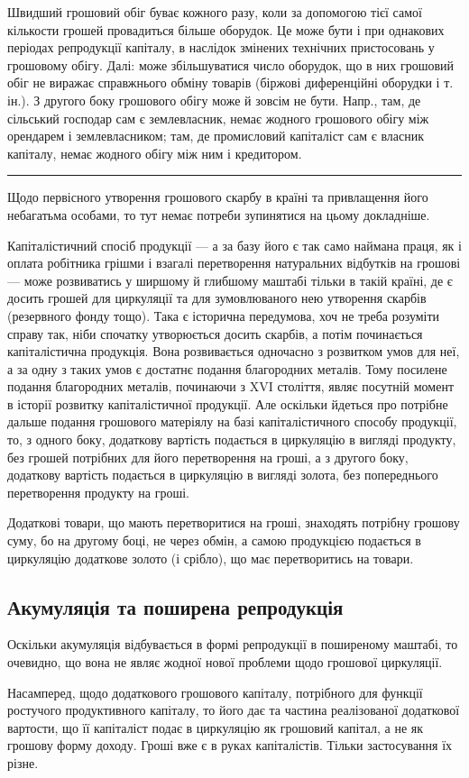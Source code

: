 
Швидший грошовий обіг буває кожного разу, коли за допомогою тієї
самої кількости грошей провадиться більше оборудок. Це може бути і
при однакових періодах репродукції капіталу, в наслідок змінених технічних
пристосовань у грошовому обігу. Далі: може збільшуватися число
оборудок, що в них грошовий обіг не виражає справжнього обміну товарів
(біржові диференційні оборудки і т. ін.). З другого боку грошового
обігу може й зовсім не бути. Напр., там, де сільський господар сам є
землевласник, немає жодного грошового обігу між орендарем і землевласником;
там, де промисловий капіталіст сам є власник капіталу, немає
жодного обігу між ним і кредитором.
\pfbreak
Щодо первісного утворення грошового скарбу в країні та привлащення
його небагатьма особами, то тут немає потреби зупинятися на
цьому докладніше.

Капіталістичний спосіб продукції — а за базу його є так само наймана
праця, як і оплата робітника грішми і взагалі перетворення натуральних
відбутків на грошові — може розвиватись у ширшому й глибшому маштабі
тільки в такій країні, де є досить грошей для циркуляції та для
зумовлюваного нею утворення скарбів (резервного фонду тощо). Така є
історична передумова, хоч не треба розуміти справу так, ніби спочатку
утворюється досить скарбів, а потім починається капіталістична продукція.
Вона розвивається одночасно з розвитком умов для неї, а за одну з
таких умов є достатнє подання благородних металів. Тому посилене подання
благородних металів, починаючи з XVI століття, являє посутній
момент в історії розвитку капіталістичної продукції. Але оскільки йдеться
про потрібне дальше подання грошового матеріялу на базі капіталістичного
способу продукції, то, з одного боку, додаткову вартість
подається в циркуляцію в вигляді продукту, без грошей потрібних для
його перетворення на гроші, а з другого боку, додаткову вартість подається
в циркуляцію в вигляді золота, без попереднього перетворення
продукту на гроші.

Додаткові товари, що мають перетворитися на гроші, знаходять потрібну
грошову суму, бо на другому боці, не через обмін, а самою продукцією
подається в циркуляцію додаткове золото (і срібло), що має
перетворитись на товари.

\subsection{Акумуляція та поширена репродукція}

Оскільки акумуляція відбувається в формі репродукції в поширеному
маштабі, то очевидно, що вона не являє жодної нової проблеми щодо грошової
циркуляції.

Насамперед, щодо додаткового грошового капіталу, потрібного для
функції ростучого продуктивного капіталу, то його дає та частина реалізованої
додаткової вартости, що її капіталіст подає в циркуляцію як грошовий
капітал, а не як грошову форму доходу. Гроші вже є в руках
капіталістів. Тільки застосування їх різне.
